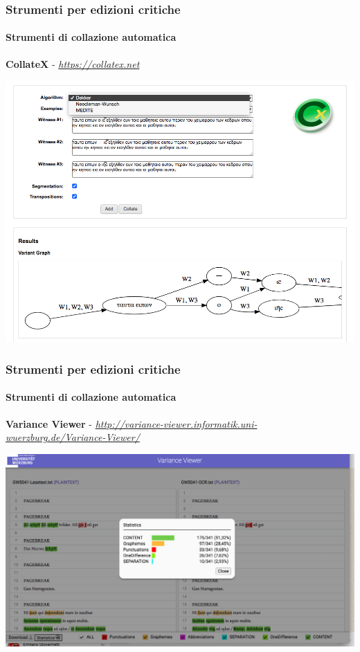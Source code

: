 

\begin{frame}
    \frametitle{Strumenti per edizioni critiche}
    \framesubtitle{Strumenti di collazione automatica}
	\addtocounter{nframe}{1}
    \begin{center}
        \textbf{CollateX} - \textit{\url{https://collatex.net}}
    \end{center}

    \begin{center}
        \includegraphics[width=.85\textwidth]{imgs/collatex.png}
	\end{center}
\end{frame}

\begin{frame}
    \frametitle{Strumenti per edizioni critiche}
    \framesubtitle{Strumenti di collazione automatica}
	\addtocounter{nframe}{1}
    \begin{center}
        \textbf{Variance Viewer} - \textit{\url{http://variance-viewer.informatik.uni-wuerzburg.de/Variance-Viewer/}}
    \end{center}
    \begin{center}
        \includegraphics[width=.95\textwidth]{imgs/variance-viewer.png}
	\end{center}
\end{frame}

